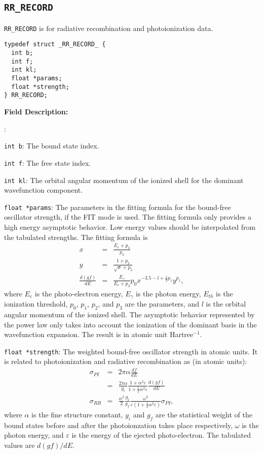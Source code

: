 \documentclass[twoside,letterpaper]{refrep}
\newenvironment{dbdesc}{\textbf{Field Description:} \begin{list}
	{:}{\setlength{\labelwidth}{2in}
	   \setlength{\leftmargin}{2in}
	   \setlength{\labelsep}{0.1in}
	   \setlength{\rightmargin}{0.2in}}}
	{\end{list}}
\begin{document}
\subsection{\texttt{RR\_RECORD}}
\texttt{RR\_RECORD} is for radiative recombination and photoionization data.

\begin{verbatim}
typedef struct _RR_RECORD_ {
  int b;
  int f;
  int kl;
  float *params;
  float *strength;
} RR_RECORD;
\end{verbatim}

\begin{dbdesc}
\item[\texttt{int b}:] The bound state index.
\item[\texttt{int f}:] The free state index.
\item[\texttt{int kl}:] The orbital angular momentum of the ionized shell for
the dominant wavefunction component.
\item[\texttt{float *params}:] The parameters in the fitting formula for the
bound-free oscillator strength, if the FIT mode is
used. The fitting formula only provides a high energy asymptotic behavior. Low
energy values should be interpolated from the tabulated strengths. The fitting
formula is
\begin{eqnarray}
x &=& \frac{E_e+p_3}{p_3} \nonumber\\
y &=& \frac{1+p_2}{\sqrt{x}+p_2} \nonumber\\
\frac{d(gf)}{dE} &=&
\frac{E_\gamma}{E_e+p_3}p_0x^{-3.5-l+\frac{1}{2}p_1}y^{p_1}, 
\end{eqnarray}
where $E_e$ is the photo-electron energy, $E_\gamma$ is the photon energy,
$E_{th}$ is the ionization threshold, $p_0$, $p_1$, $p_2$, and $p_3$ are the
parameters, and $l$ is the orbital angular momentum of the ionized
shell. The asymptotic behavior represented by the power law only takes into
account the ionization of the dominant basis in the wavefunction
expansion. The result is in atomic unit Hartree$^{-1}$.
\item[\texttt{float *strength}:] The weighted bound-free oscillator strength in
atomic units. It is related to photoionization and radiative recombination as
(in atomic units):
\begin{eqnarray}
\sigma_{PI} &=& 2\pi\alpha\frac{d f}{d E} \nonumber\\
            &=& \frac{2\pi\alpha}{g_i}
		 \frac{1+\alpha^2\varepsilon}{1+\frac{1}{2}\alpha^2 \varepsilon} 
		 \frac{d(gf)}{d E} \nonumber\\
\sigma_{RR} &=& \frac{\alpha^2}{2}\frac{g_i}{g_f}
                \frac{\omega^2}{\varepsilon \left(1+\frac{1}{2}\alpha^2
                  \varepsilon\right)} \sigma_{PI},
\end{eqnarray}
where $\alpha$ is the fine structure constant, $g_i$ and $g_f$ are the
statistical weight of the bound states before and after the photoionzation
takes place respectively, $\omega$ is the photon energy, and $\varepsilon$ is
the energy of the ejected photo-electron. The tabulated values are $d(gf)/dE$.
\end{dbdesc}
\end{document}
